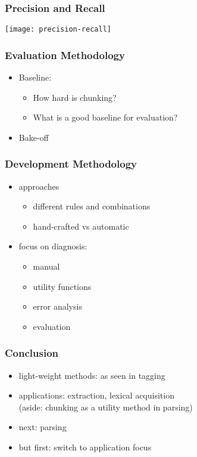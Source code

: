 \begin{frame}[fragile]\frametitle{Precision and Recall}
\begin{center}
\texttt{[image: precision-recall]}
\end{center}
\end{frame}

\begin{frame}[fragile]\frametitle{Evaluation Methodology}
  \begin{itemize}
  \item Baseline:
    \begin{itemize}
    \item How hard is chunking?
    \item What is a good baseline for evaluation?
    \end{itemize}
  \item Bake-off
  \end{itemize}
\end{frame}

\begin{frame}[fragile]\frametitle{Development Methodology}
  \begin{itemize}
  \item approaches
    \begin{itemize}
    \item different rules and combinations
    \item hand-crafted vs automatic
    \end{itemize}
  \item focus on diagnosis:
    \begin{itemize}
    \item manual
    \item utility functions
    \item error analysis
    \item evaluation
    \end{itemize}
  \end{itemize}
\end{frame}

\begin{frame}[fragile]\frametitle{Conclusion}
  \begin{itemize}
  \item light-weight methods: as seen in tagging
  \item applications: extraction, lexical acquisition\\
    (aside: chunking as a utility method in parsing)
  \item next: parsing
  \item but first: switch to application focus
  \end{itemize}
\end{frame}


